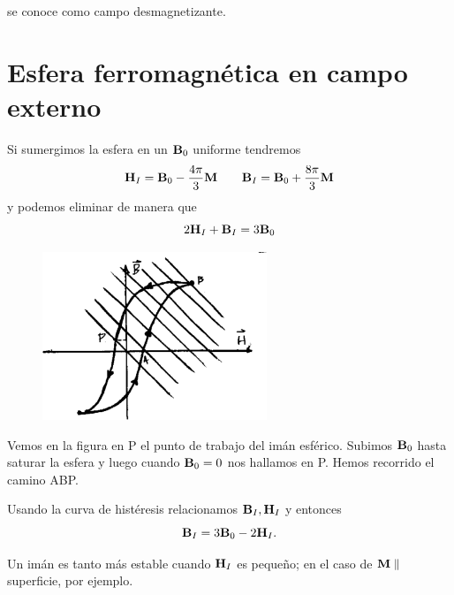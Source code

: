 \documentclass[10pt,oneside]{CBFT_book}
\begin{document}
 se conoce como campo desmagnetizante.


\section{Esfera ferromagnética en campo externo}

Si sumergimos la esfera en un $\vb{B}_0$ uniforme tendremos
\[
	\vb{H}_I = \vb{B}_0 - \frac{4\pi}{3} \vb{M} \qquad \vb{B}_I = \vb{B}_0 + \frac{8\pi}{3} \vb{M}
\]
y podemos eliminar  de manera que 
\[
	2\vb{H}_I + \vb{B}_I = 3\vb{B}_0
\]

\begin{figure}[htb]
	\begin{center}
	\includegraphics[width=0.6\textwidth]{images/fig_ft1_magnetiz2.pdf}	 
	\end{center}
	\caption{}
\end{figure} 

Vemos en la figura en P el punto de trabajo del imán esférico. Subimos $\vb{B}_0$ hasta saturar la
esfera y luego cuando $\vb{B}_0 = 0$ nos hallamos en P. Hemos recorrido el camino ABP.

Usando la curva de histéresis relacionamos $\vb{B}_I, \vb{H}_I$ y entonces
\[
	\vb{B}_I = 3 \vb{B}_0  - 2 \vb{H}_I.
\]

Un imán es tanto más estable cuando $\vb{H}_I$ es pequeño; en el caso de $\vb{M} \parallel$ superficie,
por ejemplo.

\end{document}
